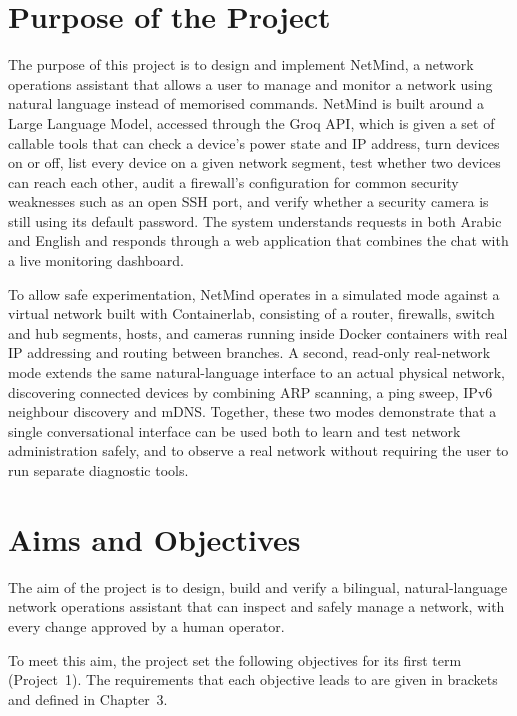 \section{Purpose of the Project}

The purpose of this project is to design and implement NetMind, a network
operations assistant that allows a user to manage and monitor a network using
natural language instead of memorised commands. NetMind is built around a
Large Language Model, accessed through the Groq API, which is given a set of
callable tools that can check a device's power state and IP address, turn
devices on or off, list every device on a given network segment, test whether
two devices can reach each other, audit a firewall's configuration for common
security weaknesses such as an open SSH port, and verify whether a security
camera is still using its default password. The system understands requests
in both Arabic and English and responds through a web application that
combines the chat with a live monitoring dashboard.

To allow safe experimentation, NetMind operates in a simulated mode against a
virtual network built with Containerlab, consisting of a router, firewalls,
switch and hub segments, hosts, and cameras running inside Docker containers
with real IP addressing and routing between branches. A second, read-only
real-network mode extends the same natural-language interface to an actual
physical network, discovering connected devices by combining ARP scanning, a
ping sweep, IPv6 neighbour discovery and mDNS. Together, these two modes
demonstrate that a single conversational interface can be used both to learn
and test network administration safely, and to observe a real network
without requiring the user to run separate diagnostic tools.

\section{Aims and Objectives}

The aim of the project is to design, build and verify a bilingual,
natural-language network operations assistant that can inspect and safely
manage a network, with every change approved by a human operator.

To meet this aim, the project set the following objectives for its first
term (Project~1). The requirements that each objective leads to are given in
brackets and defined in Chapter~3.


